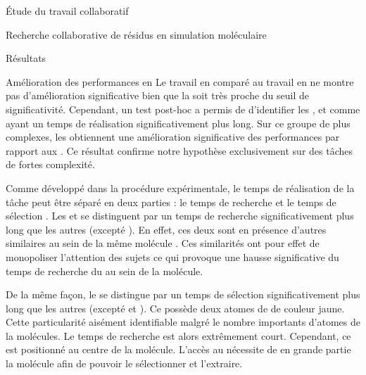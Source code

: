 \documentclass[myfrancais]{mythesis}
\begin{document}
\begin{mypart}{Étude du travail collaboratif}
\begin{mychapter}{Recherche collaborative de résidus en simulation moléculaire}
\begin{mysection}{Résultats}
\begin{mysubsection}{Amélioration des performances en }
					Le travail en  comparé au travail en  ne montre pas d'amélioration significative bien que la \mypvalue soit très proche du seuil de significativité.
					Cependant, un test post-hoc a permis de d'identifier les  ,  et  comme ayant un temps de réalisation significativement plus long.
					Sur ce groupe de  plus complexes, les  obtiennent une amélioration significative des performances par rapport aux .
					Ce résultat confirme notre hypothèse  exclusivement sur des tâches de fortes complexité.

					Comme développé dans la procédure expérimentale, le temps de réalisation de la tâche peut être séparé en deux parties : le temps de recherche et le temps de sélection .
					Les   et  se distinguent par un temps de recherche significativement plus long que les autres  (excepté ).
					En effet, ces deux  sont en présence d'autres  similaires au sein de la même molécule .
					Ces similarités ont pour effet de monopoliser l'attention des sujets ce qui provoque une hausse significative du temps de recherche du  au sein de la molécule.

					De la même façon, le   se distingue par un temps de sélection significativement plus long que les autres  (excepté  et ).
					Ce  possède deux atomes de  de couleur jaune.
					Cette particularité aisément identifiable malgré le nombre importants d'atomes de la molécules.
					Le temps de recherche est alors extrêmement court.
					Cependant, ce  est positionné au centre de la molécule.
					L'accès au  nécessite de  en grande partie la molécule afin de pouvoir le sélectionner et l'extraire.


\end{mysubsection}
\end{mysection}
\end{mychapter}
\end{mypart}
\end{document}
